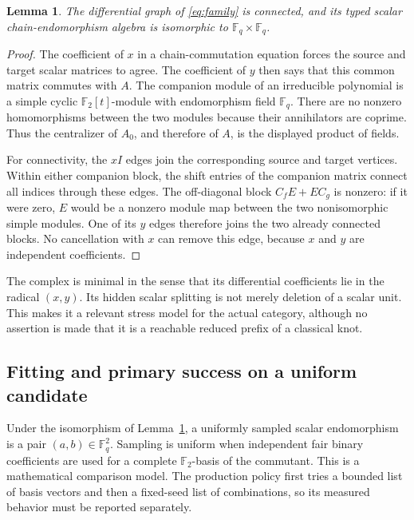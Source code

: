 \documentclass[11pt,a4paper]{article}
\newtheorem{lemma}[theorem]{Lemma}
\theoremstyle{definition}\newtheorem{definition}[theorem]{Definition}
\theoremstyle{remark}\newtheorem{remark}[theorem]{Remark}
\newcommand{\F}{\mathbb F_2}
\begin{document}
\begin{lemma}\label{lem:connected}
The differential graph of \eqref{eq:family} is connected, and its typed
scalar chain-endomorphism algebra is isomorphic to
$\mathbb F_q\times\mathbb F_q$.
\end{lemma}
\begin{proof}
The coefficient of $x$ in a chain-commutation equation forces the source
and target scalar matrices to agree. The coefficient of $y$ then says that
this common matrix commutes with $A$. The companion module of an irreducible
polynomial is a simple cyclic $\F[t]$-module with endomorphism field
$\mathbb F_q$. There are no nonzero homomorphisms between the two modules
because their annihilators are coprime. Thus the centralizer of $A_0$, and
therefore of $A$, is the displayed product of fields.

For connectivity, the $xI$ edges join the corresponding source and target
vertices. Within either companion block, the shift entries of the companion
matrix connect all indices through these edges. The off-diagonal block
$C_fE+EC_g$ is nonzero: if it were zero, $E$ would be a nonzero module map
between the two nonisomorphic simple modules. One of its $y$ edges therefore
joins the two already connected blocks. No cancellation with $x$ can remove
this edge, because $x$ and $y$ are independent coefficients.
\end{proof}

The complex is minimal in the sense that its differential coefficients lie
in the radical $(x,y)$. Its hidden scalar splitting is not merely deletion
of a scalar unit. This makes it a relevant stress model for the actual
category, although no assertion is made that it is a reachable reduced
prefix of a classical knot.

\subsection{Fitting and primary success on a uniform candidate}

Under the isomorphism of Lemma~\ref{lem:connected}, a uniformly sampled
scalar endomorphism is a pair $(a,b)\in\mathbb F_q^2$. Sampling is uniform
when independent fair binary coefficients are used for a complete
$\F$-basis of the commutant. This is a mathematical comparison model. The
production policy first tries a bounded list of basis vectors and then a
fixed-seed list of combinations, so its measured behavior must be reported
separately.
\end{document}
